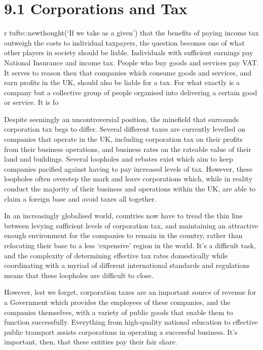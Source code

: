 \documentclass[]{tufte-handout}
\begin{document}
\hypertarget{corporations-and-tax}{%
\section{9.1 Corporations and Tax}\label{corporations-and-tax}}

r tufte::newthought(`If we take as a given') that the benefits of paying
income tax outweigh the costs to individual taxpayers, the question
becomes one of what other players in society should be liable.
Individuals with sufficient earnings pay National Insurance and income
tax. People who buy goods and services pay VAT. It serves to reason then
that companies which consume goods and services, and earn profits in the
UK, should also be liable for a tax. For what exactly is a company but a
collective group of people organised into delivering a certain good or
service. It is fo

Despite seemingly an uncontroversial position, the minefield that
surrounds corporation tax begs to differ. Several different taxes are
currently levelled on companies that operate in the UK, including
corporation tax on their profits from their business operations, and
business rates on the rateable value of their land and buildings.
Several loopholes and rebates exist which aim to keep companies pacified
against having to pay increased levels of tax. However, these loopholes
often overstep the mark and leave corporations which, while in reality
conduct the majority of their business and operations within the UK, are
able to claim a foreign base and avoid taxes all together.

In an increasingly globalised world, countries now have to tread the
thin line between levying sufficient levels of corporation tax, and
maintaining an attractive enough environment for the companies to remain
in the country, rather than relocating their base to a less `expensive'
region in the world. It's a difficult task, and the complexity of
determining effective tax rates domestically while coordinating with a
myriad of different international standards and regulations means that
these loopholes are difficult to close.

However, lest we forget, corporation taxes are an important source of
revenue for a Government which provides the employees of these
companies, and the companies themselves, with a variety of public goods
that enable them to function successfully. Everything from high-quality
national education to effective public transport assists corporations in
operating a successful business. It's important, then, that these
entities pay their fair share.
\end{document}
